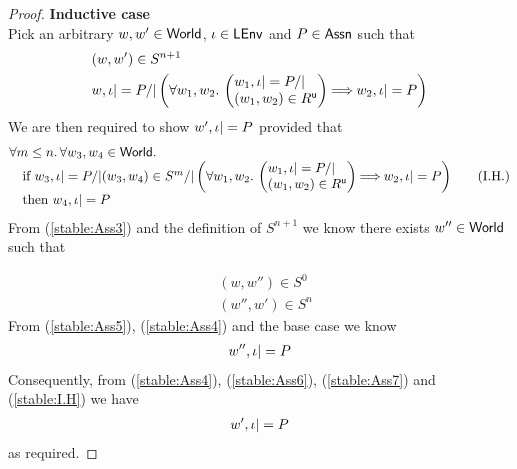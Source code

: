\begin{lemma}[Stability]
\begin{proof}
\noindent\textbf{Inductive case}\\
Pick an arbitrary $w, w' \in \textsf{World}$, $\iota \in \textsf{LEnv}$ and $P \in \textsf{Assn}$ such that
%
\begin{align}
	& (w, w') \in S^{n+1} \label{stable:Ass3}\\
	& w, \lenv |= P /| 
		\left(
		\begin{array}{@{} l @{}}
			\for{w_1, w_2} 
			\left(
			\begin{array}{@{} l @{}}
				w_1, \lenv |= P /|\\
			 (w_1, w_2) \in \updateR  
			\end{array}
			\right)
			\!\!\implies \!\!
			w_2, \lenv |= P 
		\end{array}
		\right) \label{stable:Ass4}
\end{align}
%
We are then required to show $w', \iota |= P$ provided that
%
\begin{align}
	\begin{array}{@{} l @{}}
		\for{m \leq n} \for{w_3, w_4 \in \Worlds} \\
		\quad \text{if } w_3, \lenv |= P /| (w_3, w_4) \in S^{m} /| 
		\left(
		\begin{array}{@{} l @{}}
			\for{w_1, w_2} 
			\left(
			\begin{array}{@{} l @{}}
				w_1, \lenv |= P /|\\
			 (w_1, w_2) \in \updateR  
			\end{array}
			\right)
			\!\!\implies \!\!
			w_2, \lenv |= P 
		\end{array}
		\right)\\
		\quad \text{then } w_4, \lenv |= P
	\end{array}\tag{I.H.} \label{stable:I.H}
\end{align}
%
From (\ref{stable:Ass3}) and the definition of $S^{n+1}$ we know there exists $w'' \in \textsf{World}$ such that 

\begin{align}
	& (w, w'') \in S^{0} \label{stable:Ass5} \\
	& (w'', w') \in S^{n} \label{stable:Ass6}
\end{align}
%
From (\ref{stable:Ass5}), (\ref{stable:Ass4}) and the base case we know 
%
\begin{align}
	w'', \iota |= P \label{stable:Ass7}
\end{align}
%
Consequently, from (\ref{stable:Ass4}), (\ref{stable:Ass6}), (\ref{stable:Ass7}) and (\ref{stable:I.H}) we have
%
\begin{align*}
	w', \iota |= P
\end{align*}
as required.
%
%
\end{proof}
%	 
\end{lemma}
%
